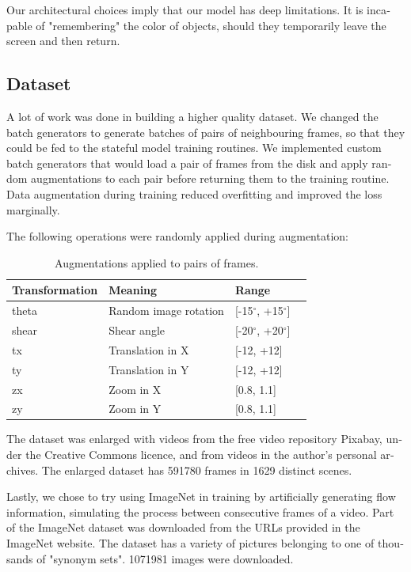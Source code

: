 \documentclass[12pt,openright,twoside,a4paper,english]{abntex2}
\begin{document}
\begin{otherlanguage}{english}
Our architectural choices imply that our model has deep limitations. It is incapable of "remembering" the color of objects, should they temporarily leave the screen and then return.

\subsection{Dataset}

A lot of work was done in building a higher quality dataset. We changed the batch generators to generate batches of pairs of neighbouring frames, so that they could be fed to the stateful model training routines. We implemented custom batch generators that would load a pair of frames from the disk and apply random augmentations to each pair before returning them to the training routine. Data augmentation during training reduced overfitting and improved the loss marginally.

The following operations were randomly applied during augmentation:

\begin{table}[H]
    \centering
    \begin{tabular}{llll}
    Transformation & Meaning               & Range          &  \\ \hline
    theta          & Random image rotation & [-15$^{\circ}$, +15$^{\circ}$]   &  \\
    shear          & Shear angle           & [-20$^{\circ}$, +20$^{\circ}$] &  \\ \hline
    tx             & Translation in X      & [-12, +12]       &  \\
    ty             & Translation in Y      & [-12, +12]       &  \\ \hline
    zx             & Zoom in X             & [0.8, 1.1]       &  \\
    zy             & Zoom in Y             & [0.8, 1.1]       &  \\ \hline
    \end{tabular}
    \label{table:augmentations}
    \caption{Augmentations applied to pairs of frames.}
\end{table}

The dataset was enlarged with videos from the free video repository Pixabay, under the Creative Commons licence, and from videos in the author's personal archives. The enlarged dataset has 591780 frames in 1629 distinct scenes.

Lastly, we chose to try using ImageNet \cite{imagenet_cvpr09} in training by artificially generating flow information, simulating the process between consecutive frames of a video. Part of the ImageNet dataset was downloaded from the URLs provided in the ImageNet website. The dataset has a variety of pictures belonging to one of thousands of "synonym sets". 1071981 images were downloaded.


\end{otherlanguage}
\end{document}
